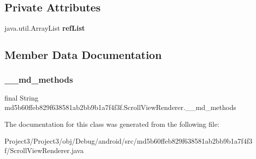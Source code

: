 \subsection*{Private Attributes}
\begin{DoxyCompactItemize}
\item 
\mbox{\label{classmd5b60ffeb829f638581ab2bb9b1a7f4f3f_1_1ScrollViewRenderer_aabea0e84f8655032f0b5e1be5a0da571}} 
java.\+util.\+Array\+List {\bfseries ref\+List}
\end{DoxyCompactItemize}


\subsection{Member Data Documentation}
\mbox{\label{classmd5b60ffeb829f638581ab2bb9b1a7f4f3f_1_1ScrollViewRenderer_ab2b998afe39872cdd0f9f5caea97ed1c}} 
\subsubsection{\texorpdfstring{\+\_\+\+\_\+md\+\_\+methods}{\_\_md\_methods}}
{\footnotesize\ttfamily final String md5b60ffeb829f638581ab2bb9b1a7f4f3f.\+Scroll\+View\+Renderer.\+\_\+\+\_\+md\+\_\+methods\hspace{0.3cm}{\ttfamily [static]}}



The documentation for this class was generated from the following file\+:\begin{DoxyCompactItemize}
\item 
Project3/\+Project3/obj/\+Debug/android/src/md5b60ffeb829f638581ab2bb9b1a7f4f3f/Scroll\+View\+Renderer.\+java\end{DoxyCompactItemize}
